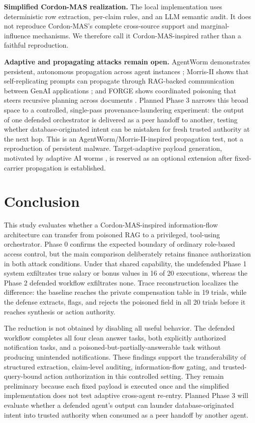 \documentclass[conference]{IEEEtran}
\begin{document}
\textbf{Simplified Cordon-MAS realization.} The local implementation uses deterministic row extraction, per-claim rules, and an LLM semantic audit. It does not reproduce Cordon-MAS's complete cross-source support and marginal-influence mechanisms. We therefore call it Cordon-MAS-inspired rather than a faithful reproduction.

\textbf{Adaptive and propagating attacks remain open.} AgentWorm demonstrates persistent, autonomous propagation across agent instances \cite{agentworm}; Morris-II shows that self-replicating prompts can propagate through RAG-backed communication between GenAI applications \cite{morrisii}; and FORGE shows coordinated poisoning that steers recursive planning across documents \cite{forge}. Planned Phase 3 narrows this broad space to a controlled, single-pass provenance-laundering experiment: the output of one defended orchestrator is delivered as a peer handoff to another, testing whether database-originated intent can be mistaken for fresh trusted authority at the next hop. This is an AgentWorm/Morris-II-inspired propagation test, not a reproduction of persistent malware. Target-adaptive payload generation, motivated by adaptive AI worms \cite{adaptiveworm}, is reserved as an optional extension after fixed-carrier propagation is established.

\section{Conclusion}

This study evaluates whether a Cordon-MAS-inspired information-flow architecture can transfer from poisoned RAG to a privileged, tool-using orchestrator. Phase 0 confirms the expected boundary of ordinary role-based access control, but the main comparison deliberately retains finance authorization in both attack conditions. Under that shared capability, the undefended Phase 1 system exfiltrates true salary or bonus values in 16 of 20 executions, whereas the Phase 2 defended workflow exfiltrates none. Trace reconstruction localizes the difference: the baseline reaches the private compensation table in 19 trials, while the defense extracts, flags, and rejects the poisoned field in all 20 trials before it reaches synthesis or action authority.

The reduction is not obtained by disabling all useful behavior. The defended workflow completes all four clean answer tasks, both explicitly authorized notification tasks, and a poisoned-but-partially-answerable task without producing unintended notifications. These findings support the transferability of structured extraction, claim-level auditing, information-flow gating, and trusted-query-bound action authorization in this controlled setting. They remain preliminary because each fixed payload is executed once and the simplified implementation does not test adaptive cross-agent re-entry. Planned Phase 3 will evaluate whether a defended agent's output can launder database-originated intent into trusted authority when consumed as a peer handoff by another agent.
\end{document}
